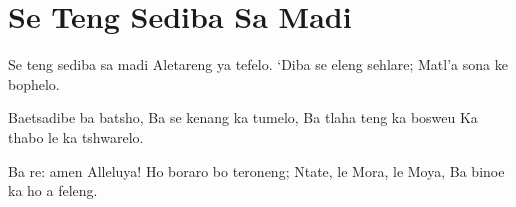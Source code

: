 \starttocol
\chapter{Se Teng Sediba Sa Madi}
\nexttocol
\hfill{\it }
\stoptocol
\starttocol
\startlines
{\sc Se teng} sediba sa madi
Aletareng ya tefelo.
`Diba se eleng sehlare;
Matl'a sona ke bophelo.

Baetsadibe ba batsho,
Ba se kenang ka tumelo,
Ba tlaha teng ka bosweu
Ka thabo le ka tshwarelo.

Ba re: amen Alleluya!
Ho boraro bo teroneng;
Ntate, le Mora, le Moya, 
Ba binoe ka ho a feleng.
\stoplines
\nexttocol

\stoptocol
